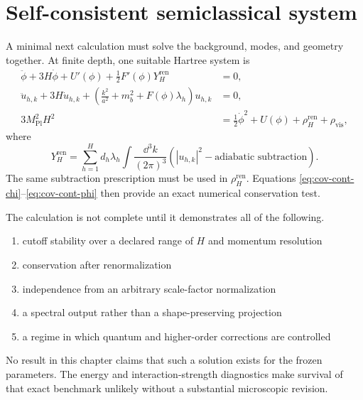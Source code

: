 \section{Self-consistent semiclassical system}

A minimal next calculation must solve the background, modes, and geometry together.  At finite depth, one suitable Hartree system is
\begin{align}
\ddot\phi+3H\dot\phi+U'(\phi)
+\frac12F'(\phi)Y_H^{\mathrm{ren}}&=0,
\label{eq:back-hartree-phi}\\
\ddot u_{h,k}+3H\dot u_{h,k}
+\left(\frac{k^2}{a^2}+m_b^2+F(\phi)\lambda_h\right)u_{h,k}&=0,
\label{eq:back-hartree-mode}\\
3M_{\mathrm{Pl}}^2H^2
&=\frac12\dot\phi^2+U(\phi)+\rho_H^{\mathrm{ren}}+\rho_{\mathrm{vis}},
\label{eq:back-hartree-friedmann}
\end{align}
where
\begin{equation}
Y_H^{\mathrm{ren}}
=\sum_{h=1}^{H}d_h\lambda_h
\int\frac{\dd^3k}{(2\pi)^3}
\left(|u_{h,k}|^2-\text{adiabatic subtraction}\right).
\label{eq:back-Yren}
\end{equation}
The same subtraction prescription must be used in $\rho_H^{\mathrm{ren}}$.  Equations \eqref{eq:cov-cont-chi}--\eqref{eq:cov-cont-phi} then provide an exact numerical conservation test.

The calculation is not complete until it demonstrates all of the following.
\begin{enumerate}[leftmargin=2.2em]
\item cutoff stability over a declared range of $H$ and momentum resolution
\item conservation after renormalization
\item independence from an arbitrary scale-factor normalization
\item a spectral output rather than a shape-preserving projection
\item a regime in which quantum and higher-order corrections are controlled
\end{enumerate}

No result in this chapter claims that such a solution exists for the frozen parameters.  The energy and interaction-strength diagnostics make survival of that exact benchmark unlikely without a substantial microscopic revision.
